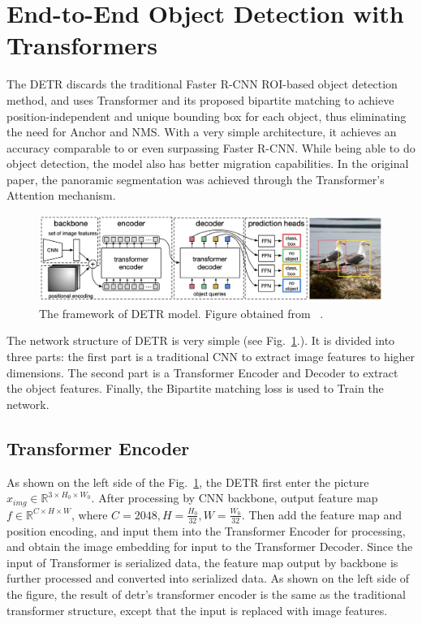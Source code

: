 \section{End-to-End Object Detection with Transformers}
The DETR discards the traditional Faster R-CNN ROI-based object detection method, and uses Transformer and its proposed bipartite matching to achieve position-independent and unique bounding box for each object, thus eliminating the need for Anchor and NMS. With a very simple architecture, it achieves an accuracy comparable to or even surpassing Faster R-CNN. While being able to do object detection, the model also has better migration capabilities. In the original paper, the panoramic segmentation was achieved through the Transformer's Attention mechanism. 

\begin{figure}[!htbp]
	\centering
	\includegraphics[width = 1 \textwidth]{figures/DETR.png}
	\caption[The framework of DETR model]
	{ The framework of DETR model. Figure obtained from ~\cite{carion2020end}.}
	\label{fig:detr}
\end{figure}

The network structure of DETR is very simple (see Fig.~\ref{fig:detr}.). It is divided into three parts: the first part is a traditional CNN to extract image features to higher dimensions. The second part is a Transformer Encoder and Decoder to extract the object features. Finally, the Bipartite matching loss is used to Train the network. 

\subsection{Transformer Encoder}

As shown on the left side of the Fig.~\ref{fig:detr}, the DETR first enter the picture $ x_{img} \in  \mathbb{R} ^{3\times H_0\times W_0} $. After processing by CNN backbone, output feature map $ f \in \mathbb{R} ^{C\times H\times W } $, where $ C = 2048, H=\frac{H_0}{32}, W=\frac{W_0}{32}  $. Then add the feature map and position encoding, and input them into the Transformer Encoder for processing, and obtain the image embedding for input to the Transformer Decoder. Since the input of Transformer is serialized data, the feature map output by backbone is further processed and converted into serialized data. 
As shown on the left side of the figure, the result of detr's transformer encoder is the same as the traditional transformer structure, except that the input is replaced with image features.

